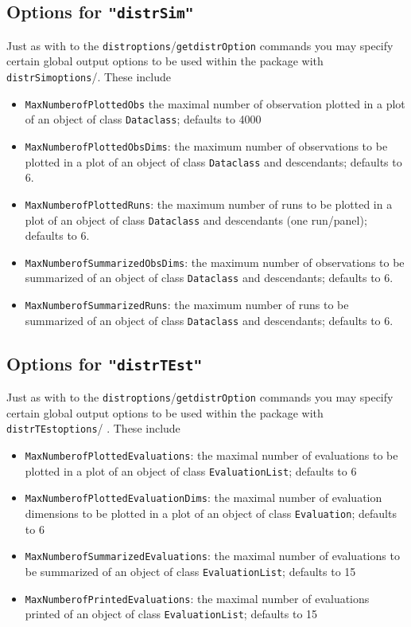 \documentclass[11pt]{article}
\newcommand{\code}[1]{{\tt #1}}
\newcommand{\pkg}[1]{{\tt "#1"}}
\begin{document}
%
\subsection[Options for distrSim]{Options for \pkg{distrSim}}
Just as with to the \code{distroptions}/\code{getdistrOption} commands you 
may specify certain global output options to be used within the package with 
\code{distrSimoptions}/\linebreak[4] \code{getdistrSimOption}. These include
\begin{itemize}
  \item \code{MaxNumberofPlottedObs} the maximal number of observation plotted 
  in a plot of an object of class \code{Dataclass}; defaults to 4000

  \item \code{MaxNumberofPlottedObsDims}: the maximum number of observations to 
  be plotted in a plot of an object of class \code{Dataclass}
  and descendants; defaults to 6.
  \item \code{MaxNumberofPlottedRuns}: the maximum number of runs to be plotted 
  in a plot of an object of class \code{Dataclass}
  and descendants (one run/panel); defaults to 6.
  \item \code{MaxNumberofSummarizedObsDims}: the maximum number of observations 
  to be summarized of an object of class \code{Dataclass}
  and descendants; defaults to 6.
  \item \code{MaxNumberofSummarizedRuns}: the maximum number of runs to be
   summarized of an object of class \code{Dataclass}
  and descendants; defaults to 6.
\end{itemize}
%
\subsection[Options for distrTEst]{Options for \pkg{distrTEst}}
Just as with to the \code{distroptions}/\code{getdistrOption} commands you may 
specify certain
global output options to be used within the package with 
\code{distrTEstoptions}/ \linebreak[4]\code{getdistrTEstOption}. These include
\begin{itemize}
  \item \code{MaxNumberofPlottedEvaluations}:  the maximal number of evaluations 
  to be plotted
  in a plot of an object of class \code{EvaluationList}; defaults to 6
  \item \code{MaxNumberofPlottedEvaluationDims}: the maximal number of
   evaluation dimensions to be plotted in a plot of an
         object of class \code{Evaluation}; defaults to 6
  \item \code{MaxNumberofSummarizedEvaluations}: the  maximal number of 
  evaluations to be summarized of an object of class
  \code{EvaluationList}; defaults to 15
  \item \code{MaxNumberofPrintedEvaluations}: the maximal number of evaluations
   printed of an object of class
  \code{EvaluationList}; defaults to 15
\end{itemize}
\end{document}
